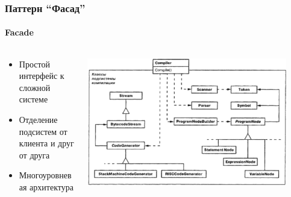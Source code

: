 \documentclass{../../slides-style}
\begin{document}
    \begin{frame}
        \frametitle{Паттерн ``Фасад''}
        \framesubtitle{Facade}
        \begin{columns}
            \begin{column}{0.4\textwidth}
                \begin{itemize}
                    \item Простой интерфейс к сложной системе
                    \item Отделение подсистем от клиента и друг от друга
                    \item Многоуровневая архитектура
                \end{itemize}
            \end{column}
            \begin{column}{0.6\textwidth}
                \begin{center}
                    \includegraphics[width=0.9\textwidth]{facadeMotivation.png}
                \end{center}
            \end{column}
        \end{columns}
    \end{frame}
\end{document}
